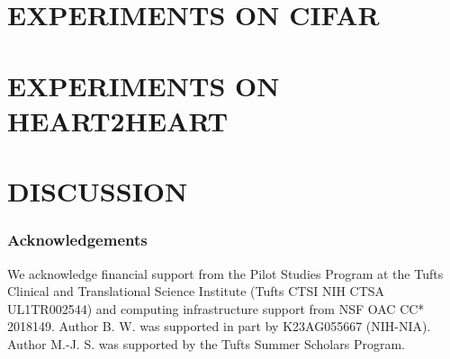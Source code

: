 \documentclass[twoside]{article}
\begin{document}
\section{EXPERIMENTS ON CIFAR}
\label{sec:results-cifar}


\section{EXPERIMENTS ON HEART2HEART}
\label{sec:results-tmed}


\section{DISCUSSION}


\subsubsection*{Acknowledgements}
We acknowledge financial support from the Pilot Studies Program at the Tufts Clinical and Translational Science Institute (Tufts CTSI NIH CTSA UL1TR002544) and computing infrastructure support from NSF OAC CC* 2018149.
Author B. W. was supported in part by K23AG055667 (NIH-NIA).
Author M.-J. S. was supported by the Tufts Summer Scholars Program.

\renewcommand{\bibsection}{\subsubsection*{References}}




\clearpage
\appendix


\setcounter{table}{0}
\setcounter{figure}{0}
\setcounter{algorithm}{0}

\makeatletter 
\let\c@table\c@figure
\let\c@lstlisting\c@figure
\let\c@algorithm\c@figure
\makeatother


 
\onecolumn
\end{document}
